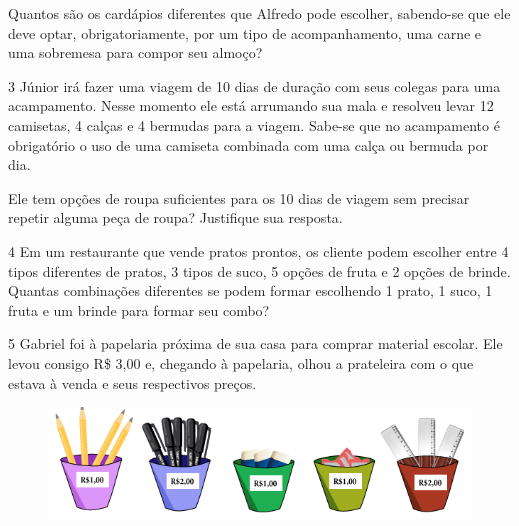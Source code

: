 Quantos são os cardápios diferentes que Alfredo pode escolher, sabendo-se
que ele deve optar, obrigatoriamente, por um tipo de acompanhamento, uma
carne e uma sobremesa para compor seu almoço?

\begin{emptybox}
\end{emptybox}

\num{3} Júnior irá fazer uma viagem de 10 dias de duração com seus colegas
para uma acampamento. Nesse momento ele está arrumando sua mala e
resolveu levar 12 camisetas, 4 calças e 4 bermudas para a viagem.
Sabe-se que no acampamento é obrigatório o uso de uma camiseta combinada
com uma calça ou bermuda por dia.

Ele tem opções de roupa suficientes para os 10 dias de viagem sem
precisar repetir alguma peça de roupa? Justifique sua resposta.

\begin{emptybox}
\bigskip
\end{emptybox}

\num{4} Em um restaurante que vende pratos prontos, os cliente podem escolher entre 4 tipos diferentes de pratos, 3 tipos de suco, 5 opções de fruta e 2 opções de brinde. Quantas combinações diferentes se podem formar escolhendo 1 prato, 1 suco, 1 fruta e um brinde para
formar seu combo?

\begin{emptybox}
\bigskip\bigskip
\end{emptybox}

\num{5} Gabriel foi à papelaria próxima de sua casa para comprar material
escolar. Ele levou consigo R\$ 3,00 e, chegando à papelaria, olhou a
prateleira com o que estava à venda e seus respectivos preços.

\begin{figure}[htpb!]
\includegraphics[width=\textwidth]{../ilustracoes/MAT5/SAEB_5ANO_MAT_figura83.png}
\end{figure}\enlargethispage{2\baselineskip}

